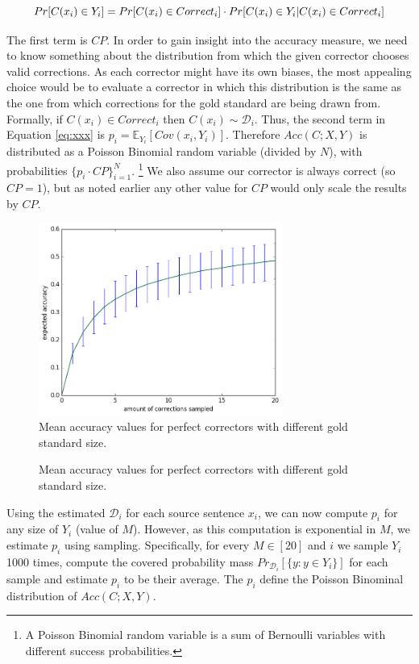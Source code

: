 \documentclass[english]{article}
\begin{document}
\begin{equation}
  \small
  Pr[C(x_i) \in Y_i] = 
  Pr[C(x_i) \in Correct_i] \cdot Pr[C(x_i) \in Y_i | C(x_i) \in Correct_i]
  \label{eq:xxx}
\end{equation}

The first term is $CP$. In order to gain insight into the accuracy measure, we need to know something about the distribution from which the given corrector chooses valid corrections. As each corrector might have its own biases, the most appealing choice would be to evaluate a corrector in which this distribution is the same as the one from which corrections for the gold standard are being drawn from. Formally, if $C(x_i) \in Correct_i$ then $C(x_i) \sim \mathcal{D}_i$. 
Thus, the second
term in Equation \ref{eq:xxx} is $p_i = \mathbb{E}_{Y_i}[Cov(x_i,Y_i)]$. Therefore $Acc(C;X,Y)$ is distributed as
a Poisson Binomial random variable (divided by $N$), with probabilities $\{p_i \cdot CP\}_{i=1}^N$. \footnote{A Poisson Binomial random variable is a sum of Bernoulli variables with different success probabilities.} We also assume our corrector is always correct (so $CP=1$), but as noted earlier any other value for $CP$ would only scale the results by $CP$.

 \begin{figure}
   	\includegraphics[width=8cm]{exact__repeat_1000_accuracy}
 	\caption{Mean accuracy values for perfect correctors with different gold standard size.}
 	\label{fig:accuracy_vals}
 \end{figure}
 \begin{figure}
   \caption{Mean accuracy values for perfect correctors with different gold standard size.}
   \label{fig:accuracy_vals_ind}
 \end{figure}

 Using the estimated $\mathcal{D}_i$ for each source sentence $x_i$, we can now compute $p_i$ for any
 size of $Y_i$ (value of $M$). However, as this computation is exponential in $M$, we estimate $p_i$ using
 sampling. Specifically, for every $M\in[20]$ and $i$ we sample $Y_i$ 1000 times, compute 
 the covered probability mass $Pr_{\mathcal{D}_i}[\{y: y \in Y_i\}]$ for each sample and estimate $p_i$ to be their
 average. The $p_i$ define the Poisson Binominal distribution of $Acc(C;X,Y)$.
\end{document}
